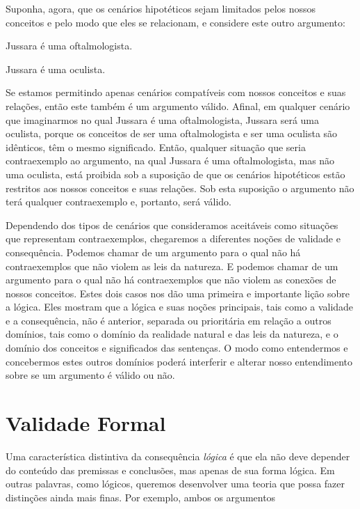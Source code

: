 Suponha, agora, que os cenários hipotéticos sejam limitados pelos nossos conceitos e pelo modo que eles se relacionam, e considere este outro argumento:
	\begin{earg}
		\item[] Jussara é uma oftalmologista.
		\item[\therefore] Jussara é uma oculista.
	\end{earg}
Se estamos permitindo apenas cenários compatíveis com nossos conceitos e suas relações, então este também é um argumento válido.
Afinal, em qualquer cenário que imaginarmos no qual Jussara é uma oftalmologista, Jussara será uma oculista, porque os conceitos de ser uma oftalmologista e ser uma oculista são idênticos, têm o mesmo significado.
Então, qualquer situação que seria contraexemplo ao argumento, na qual Jussara é uma oftalmologista, mas não uma oculista, está proibida sob a suposição de que os cenários hipotéticos estão restritos aos nossos conceitos e suas relações.
Sob esta suposição o argumento não terá qualquer contraexemplo e, portanto, será válido.

Dependendo dos tipos de cenários que consideramos aceitáveis como situações que representam contraexemplos, chegaremos a diferentes noções de validade e consequência.
Podemos chamar de \label{nomoval} um argumento para o qual não há contraexemplos que não violem as leis da natureza.
E podemos chamar de  um argumento para o qual não há contraexemplos que não violem as conexões de nossos conceitos.
Estes dois casos nos dão uma primeira e importante lição sobre a lógica.
Eles mostram que a lógica e suas noções principais, tais como a validade e a consequência, não é anterior, separada ou prioritária em relação a outros domínios, tais como o domínio da realidade natural e das leis da natureza, e o domínio dos conceitos e significados das sentenças.
O modo como entendermos e concebermos estes outros domínios poderá interferir e alterar nosso entendimento sobre se um argumento é válido ou não.

\section{Validade Formal}

Uma característica distintiva da consequência \emph{lógica} é que ela não deve depender do conteúdo das premissas e conclusões, mas apenas de sua forma lógica.
Em outras palavras, como lógicos, queremos desenvolver uma teoria que possa fazer distinções ainda mais finas. Por exemplo, ambos os argumentos

